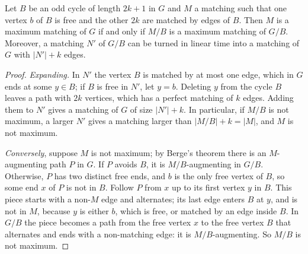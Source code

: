 \begin{lemma}[Edmonds, 1965]\label{lem:shrink}
Let $B$ be an odd cycle of length $2k+1$ in $G$ and $M$ a matching such that one vertex $b$ of $B$ is free and the other $2k$ are matched by edges of $B$. Then $M$ is a maximum matching of $G$ if and only if $M/B$ is a maximum matching of $G/B$.
Moreover, a matching $N'$ of $G/B$ can be turned in linear time into a matching of $G$ with $|N'|+k$ edges.
\end{lemma}
\begin{proof}
\emph{Expanding.} In $N'$ the vertex $B$ is matched by at most one edge, which in $G$ ends at some $y\in B$; if $B$ is free in $N'$, let $y=b$. Deleting $y$ from the cycle $B$ leaves a path with $2k$ vertices, which has a perfect matching of $k$
edges. Adding them to $N'$ gives a matching of $G$ of size $|N'|+k$. In particular, if $M/B$ is not maximum, a larger $N'$ gives a matching larger than $|M/B|+k=|M|$, and $M$ is not maximum.

\emph{Conversely}, suppose $M$ is not maximum; by Berge's theorem there is an $M$-augmenting path $P$ in $G$. If $P$ avoids $B$, it is $M/B$-augmenting in $G/B$. Otherwise, $P$ has two distinct free ends, and $b$ is the only free vertex of $B$, so some end $x$ of $P$ is
not in $B$. Follow $P$ from $x$ up to its first vertex $y$ in $B$. This piece starts with a non-$M$ edge and alternates; its last edge enters $B$ at $y$, and is not in $M$, because $y$ is either $b$, which is free, or matched by an edge inside $B$. In $G/B$
the piece becomes a path from the free vertex $x$ to the free vertex $B$ that alternates and ends with a non-matching edge: it is $M/B$-augmenting. So $M/B$ is not maximum.
\end{proof}

